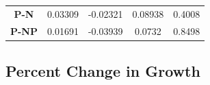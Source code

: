\documentclass[]{article}
\begin{document}
\begin{longtable}[]{@{}ccccc@{}}
\begin{minipage}[t]{0.13\columnwidth}\centering\strut
\textbf{P-N}\strut
\end{minipage} & \begin{minipage}[t]{0.14\columnwidth}\centering\strut
0.03309\strut
\end{minipage} & \begin{minipage}[t]{0.16\columnwidth}\centering\strut
-0.02321\strut
\end{minipage} & \begin{minipage}[t]{0.13\columnwidth}\centering\strut
0.08938\strut
\end{minipage} & \begin{minipage}[t]{0.13\columnwidth}\centering\strut
0.4008\strut
\end{minipage}\tabularnewline
\begin{minipage}[t]{0.13\columnwidth}\centering\strut
\textbf{P-NP}\strut
\end{minipage} & \begin{minipage}[t]{0.14\columnwidth}\centering\strut
0.01691\strut
\end{minipage} & \begin{minipage}[t]{0.16\columnwidth}\centering\strut
-0.03939\strut
\end{minipage} & \begin{minipage}[t]{0.13\columnwidth}\centering\strut
0.0732\strut
\end{minipage} & \begin{minipage}[t]{0.13\columnwidth}\centering\strut
0.8498\strut
\end{minipage}\tabularnewline
\bottomrule
\end{longtable}

\newpage

\subsection{Percent Change in Growth}\label{percent-change-in-growth}
\end{document}
